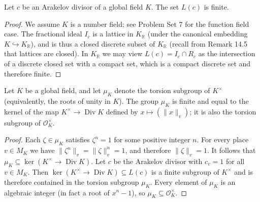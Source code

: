 \begin{lemma}[15.7]
Let $c$ be an Arakelov divisor of a global field $K$. The set $L(c)$ is finite.
\end{lemma}
\begin{proof}
We assume $K$ is a number field; see Problem Set 7 for the function field case. The fractional ideal $I_c$ is a lattice in $K_{\mathbb R}$ (under the canonical embedding $K\hookrightarrow K_{\mathbb R}$), and is thus a closed discrete subset of $K_{\mathbb R}$ (recall from Remark 14.5 that lattices are closed). In $K_{\mathbb R}$ we may view $L(c)=I_c\cap R_c$ as the intersection of a discrete closed set with a compact set, which is a compact discrete set and therefore finite.
\end{proof}
\begin{corollary}[15.8]
Let $K$ be a global field, and let $\mu_K$ denote the torsion subgroup of $K^\times$ (equivalently, the roots of unity in $K$). The group $\mu_K$ is finite and equal to the kernel of the map $K^\times\to\operatorname{Div}K$ defined by $x\mapsto(\|x\|_v)$; it is also the torsion subgroup of $\mathcal O_K^\times$.
\end{corollary}
\begin{proof}
Each $\zeta\in\mu_K$ satisfies $\zeta^n=1$ for some positive integer $n$. For every place $v\in M_K$ we have $\|\zeta^n\|_v=\|\zeta\|_v^n=1$, and therefore $\|\zeta\|_v=1$. It follows that $\mu_K\subseteq\ker(K^\times\to\operatorname{Div}K)$. Let $c$ be the Arakelov divisor with $c_v=1$ for all $v\in M_K$. Then $\ker(K^\times\to\operatorname{Div}K)\subseteq L(c)$ is a finite subgroup of $K^\times$ and is therefore contained in the torsion subgroup $\mu_K$. Every element of $\mu_K$ is an algebraic integer (in fact a root of $x^n-1$), so $\mu_K\subseteq\mathcal O_K^\times$.
\end{proof}

